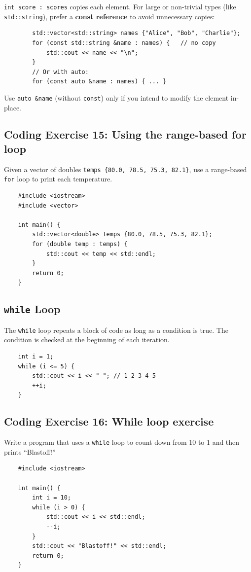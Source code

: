 \begin{remark}
	\texttt{int score : scores} copies each element. For large or non-trivial types (like \texttt{std::string}), prefer a \textbf{const reference} to avoid unnecessary copies:
	\begin{lstlisting}
		std::vector<std::string> names {"Alice", "Bob", "Charlie"};
		for (const std::string &name : names) {   // no copy
			std::cout << name << "\n";
		}
		// Or with auto:
		for (const auto &name : names) { ... }
	\end{lstlisting}
	Use \texttt{auto \&name} (without \texttt{const}) only if you intend to modify the element in-place.
\end{remark}

\subsection{Coding Exercise 15: Using the range-based for loop}
Given a vector of doubles \texttt{temps \{80.0, 78.5, 75.3, 82.1\}}, use a range-based \texttt{for} loop to print each temperature.
\begin{lstlisting}
	#include <iostream>
	#include <vector>

	int main() {
		std::vector<double> temps {80.0, 78.5, 75.3, 82.1};
		for (double temp : temps) {
			std::cout << temp << std::endl;
		}
		return 0;
	}
\end{lstlisting}

\subsection{\texttt{while} Loop}
The \texttt{while} loop repeats a block of code as long as a condition is true. The condition is checked at the beginning of each iteration.
\begin{lstlisting}
	int i = 1;
	while (i <= 5) {
		std::cout << i << " "; // 1 2 3 4 5
		++i;
	}
\end{lstlisting}

\subsection{Coding Exercise 16: While loop exercise}
Write a program that uses a \texttt{while} loop to count down from 10 to 1 and then prints ``Blastoff!''
\begin{lstlisting}
	#include <iostream>

	int main() {
		int i = 10;
		while (i > 0) {
			std::cout << i << std::endl;
			--i;
		}
		std::cout << "Blastoff!" << std::endl;
		return 0;
	}
\end{lstlisting}


